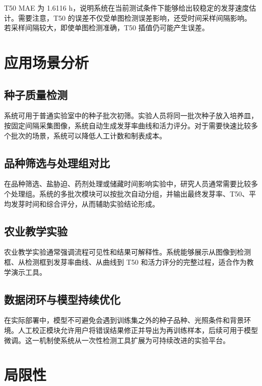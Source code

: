 \documentclass[UTF8,a4paper,zihao=-4]{ctexart}
\begin{document}
T50 MAE 为 1.6116 h，说明系统在当前测试条件下能够给出较稳定的发芽速度估计。需要注意，T50 的误差不仅受单图检测误差影响，还受时间采样间隔影响。若采样间隔较大，即使单图检测准确，T50 插值仍可能产生误差。

\section{应用场景分析}

\subsection{种子质量检测}

系统可用于普通实验室中的种子批次初筛。实验人员将同一批次种子放入培养皿，按固定间隔采集图像，系统自动生成发芽率曲线和活力评分。对于需要快速比较多个批次的场景，系统可以降低人工计数和制表成本。

\subsection{品种筛选与处理组对比}

在品种筛选、盐胁迫、药剂处理或储藏时间影响实验中，研究人员通常需要比较多个处理组。系统的多批次模块可以按批次自动分组，并输出最终发芽率、T50、平均发芽时间和综合评分，从而辅助实验结论形成。

\subsection{农业教学实验}

农业教学实验通常强调流程可见性和结果可解释性。系统能够展示从图像到检测框、从检测框到发芽率曲线、从曲线到 T50 和活力评分的完整过程，适合作为教学演示工具。

\subsection{数据闭环与模型持续优化}

在实际部署中，模型不可避免会遇到训练集之外的种子品种、光照条件和背景环境。人工校正模块允许用户将错误结果修正并导出为再训练样本，后续可用于模型微调。这一机制使系统从一次性检测工具扩展为可持续改进的实验平台。

\section{局限性}
\end{document}
